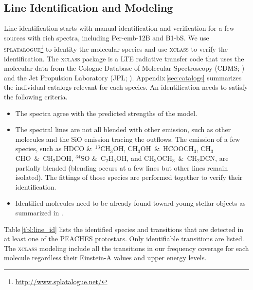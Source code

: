 \documentclass[twocolumn]{aastex62}
\newcommand{\methylformate}{\mbox{HCOOCH$_{3}$}}
\newcommand{\methanol}{\mbox{CH$_{3}$OH}}
\newcommand{\tmethanol}{\mbox{$^{13}$CH$_{3}$OH}}
\newcommand{\dmethanol}{\mbox{CH$_{2}$DOH}}
\newcommand{\dimethylether}{\mbox{CH$_{3}$OCH$_{3}$}}
\newcommand{\ethanol}{\mbox{C$_{2}$H$_{5}$OH}}
\newcommand{\acetaldehyde}{\mbox{CH$_{3}$CHO}}
\newcommand{\dmethylcyanide}{\mbox{CH$_{2}$DCN}}
\begin{document}
\subsection{Line Identification and Modeling}
\label{sec:modeling}
Line identification starts with manual identification and verification for a few sources with rich spectra, including Per-emb-12B and B1-bS.  We use \textsc{splatalogue}\footnote{\href{http://www.splatalogue.net/}{http://www.splatalogue.net/}} to identity the molecular species and use \textsc{xclass} \citep{2017AA...598A...7M} to verify the identification.  The \textsc{xclass} package is a LTE radiative transfer code that uses the molecular data from the Cologne Database of Molecular Spectroscopy (CDMS; \citealt{2001AA...370L..49M,2005JMoSt.742..215M,2016JMoSp.327...95E}) and the Jet Propulsion Laboratory (JPL; \citealt{1998JQSRT..60..883P}).  Appendix\,\ref{sec:catalogs} summarizes the individual catalogs relevant for each species.  An identification needs to satisfy the following criteria.
\begin{itemize}
  \item The spectra agree with the predicted strengths of the model.
  \item The spectral lines are not all blended with other emission, such as other molecules and the SiO emission tracing the outflows.  The emission of a few species, such as HDCO \&\ \tmethanol, \methanol\ \&\ \methylformate, \acetaldehyde\ \&\ \dmethanol, $^{34}$SO \&\ \ethanol, and \dimethylether\ \&\ \dmethylcyanide, are partially blended (blending occurs at a few lines but other lines remain isolated).  The fittings of those species are performed together to verify their identification.
  \item Identified molecules need to be already found toward young stellar objects as summarized in \citet{2018ApJS..239...17M}.
\end{itemize}
Table\,\ref{tbl:line_id} lists the identified species and transitions that are detected in at least one of the PEACHES protostars.  Only identifiable transitions are listed.  The \textsc{xclass} modeling include all the transitions in our frequency coverage for each molecule regardless their Einstein-A values and upper energy levels.  
\end{document}
